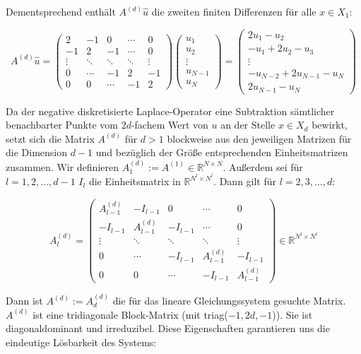 \documentclass{scrartcl}
\newcommand{\R}{\mathbb{R}}
\begin{document}
Dementsprechend enthält $A^{(d)}\hat{u}$ die zweiten finiten Differenzen für alle $x \in X_1$:

\[A^{(d)}\hat{u}=
\begin{pmatrix}
   2 & -1 &  0 & \cdots & 0 \\
  -1 &  2 & -1 & \cdots & 0 \\
   \vdots & \ddots & \ddots & \ddots & \vdots \\
   0 & \cdots & -1 &  2 & -1 \\
   0 & 0 & \cdots & -1 &  2
\end{pmatrix}
\begin{pmatrix}
  u_1\\
  u_2\\
  \vdots\\
  u_{N-1}\\
  u_N
\end{pmatrix}
=
\begin{pmatrix}
  2u_1-u_2\\
  -u_1+2u_2-u_3\\
  \vdots\\
  -u_{N-2}+2u_{N-1}-u_N\\
  2u_{N-1}-u_N
\end{pmatrix}
\]


Da der negative diskretisierte Laplace-Operator eine Subtraktion sämtlicher benachbarter Punkte vom $2d$-fachem Wert von $u$ an der Stelle $x \in X_d$ bewirkt, setzt sich die Matrix $A^{(d)}$ für $d > 1$ blockweise aus den jeweiligen Matrizen für die Dimension $d-1$ und bezüglich der Größe entsprechenden Einheitsmatrizen zusammen. Wir definieren $A^{(d)}_1 := A^{(1)} \in \R^{N\times N}$. Außerdem sei für $l = 1, 2, ..., d-1$ $I_l$ die Einheitsmatrix in $\R^{N^l \times N^l}$. Dann gilt für $l = 2, 3, ..., d$:

\[A^{(d)}_l=
\begin{pmatrix}
   A^{(d)}_{l-1} & -I_{l-1} &  0 & \cdots & 0 \\
  -I_{l-1} &  A^{(d)}_{l-1} & -I_{l-1} & \cdots & 0 \\
   \vdots & \ddots & \ddots & \ddots & \vdots \\
   0 & \cdots & -I_{l-1} &  A^{(d)}_{l-1} & -I_{l-1} \\
   0 & 0 & \cdots & -I_{l-1} &  A^{(d)}_{l-1}
\end{pmatrix}
\in\R^{N^l \times N^l}
\]

Dann ist $A^{(d)} := A^{(d)}_d$ die für das lineare Gleichungssystem gesuchte Matrix. $A^{(d)}$ ist eine tridiagonale Block-Matrix (mit triag($-1, 2d, -1$)). Sie ist diagonaldominant und irreduzibel. Diese Eigenschaften garantieren uns die eindeutige Lösbarkeit des Systems:
\end{document}
